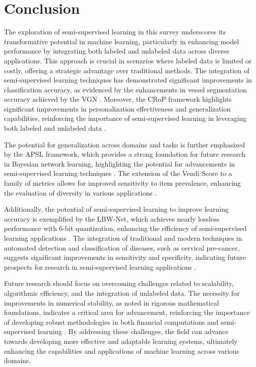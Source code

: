 \section{Conclusion} \label{sec:Conclusion}





The exploration of semi-supervised learning in this survey underscores its transformative potential in machine learning, particularly in enhancing model performance by integrating both labeled and unlabeled data across diverse applications. This approach is crucial in scenarios where labeled data is limited or costly, offering a strategic advantage over traditional methods. The integration of semi-supervised learning techniques has demonstrated significant improvements in classification accuracy, as evidenced by the enhancements in vessel segmentation accuracy achieved by the VGN \cite{shin2018deepvesselsegmentationlearning}. Moreover, the CRoP framework highlights significant improvements in personalization effectiveness and generalization capabilities, reinforcing the importance of semi-supervised learning in leveraging both labeled and unlabeled data \cite{kaur2024cropcontextwiserobuststatic}.



The potential for generalization across domains and tasks is further emphasized by the APSL framework, which provides a strong foundation for future research in Bayesian network learning, highlighting the potential for advancements in semi-supervised learning techniques \cite{ling2021bayesiannetworkstructurelearning}. The extension of the Vendi Score to a family of metrics allows for improved sensitivity to item prevalence, enhancing the evaluation of diversity in various applications \cite{pasarkar2024cousinsvendiscorefamily}.



Additionally, the potential of semi-supervised learning to improve learning accuracy is exemplified by the LBW-Net, which achieves nearly lossless performance with 6-bit quantization, enhancing the efficiency of semi-supervised learning applications \cite{yin2017quantizationtraininglowbitwidth}. The integration of traditional and modern techniques in automated detection and classification of diseases, such as cervical pre-cancer, suggests significant improvements in sensitivity and specificity, indicating future prospects for research in semi-supervised learning applications .



Future research should focus on overcoming challenges related to scalability, algorithmic efficiency, and the integration of unlabeled data. The necessity for improvements in numerical stability, as noted in rigorous mathematical foundations, indicates a critical area for advancement, reinforcing the importance of developing robust methodologies in both financial computations and semi-supervised learning \cite{kun2022mathematicalfoundationsregressionmethods}. By addressing these challenges, the field can advance towards developing more effective and adaptable learning systems, ultimately enhancing the capabilities and applications of machine learning across various domains.
